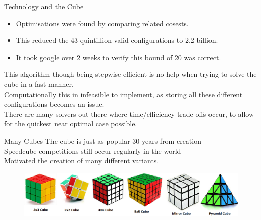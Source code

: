 \documentclass{beamer}
\begin{document}
\begin{frame}[t]{Technology and the Cube}
\begin{itemize}
\item Optimisations were found by comparing related cosests.
\item This reduced the 43 quintillion valid configurations to 2.2 billion.
\item It took google over 2 weeks to verify this bound of 20 was correct.\end{itemize}
This algorithm though being stepwise efficient is no help when trying to solve the cube in a fast manner.\\

Computationally this in infeasible to implement, as storing all these different configurations becomes an issue.\\

There are many solvers out there where time/efficiency trade offs occur, to allow for the quickest near optimal case possible.
\end{frame}

\begin{frame}[t]{Many Cubes}
The cube is just as popular 30 years from creation\\
Speedcube competitions still occur regularly in the world\\
Motivated the creation of many different variants.

\begin{figure}
\includegraphics[scale=.3]{diff.png}
\end{figure}
\end{frame}
\end{document}
